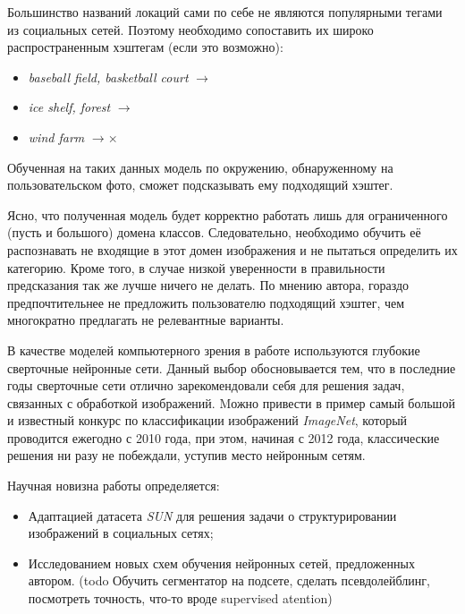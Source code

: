 \indent
  Большинство названий локаций сами по себе не являются популярными 
  тегами из социальных сетей. Поэтому необходимо
  сопоставить их широко распространенным хэштегам (если это возможно):
  
  \begin{itemize}
      \item \textit{baseball field, basketball court}  $\rightarrow$ 
      \item \textit{ice shelf, forest} $\rightarrow$ 
      \item \textit{wind farm} $\rightarrow \times$ 
  \end{itemize}
  
  \indent
  Обученная на таких данных модель по окружению,
   обнаруженному на пользовательском фото,
  сможет подсказывать ему подходящий хэштег.
  
  
  
  \indent
  Ясно, что полученная модель будет корректно работать лишь для
  ограниченного (пусть и большого) домена классов. Следовательно, необходимо 
  обучить её распознавать не входящие в этот домен изображения и
   не пытаться определить их категорию. Кроме того, в случае низкой уверенности
   в правильности предсказания так же лучше ничего не делать. 
    По мнению автора, гораздо предпочтительнее не 
   предложить пользователю подходящий хэштег, чем многократно предлагать 
   не релевантные варианты.
   
   \indent
В качестве моделей компьютерного зрения в работе 
используются глубокие сверточные
нейронные сети. Данный выбор обосновывается тем, что в последние
годы сверточные сети отлично зарекомендовали себя для решения задач, связанных
с обработкой изображений. Mожно привести в пример самый большой 
и известный
конкурс по классификации изображений \textit{ImageNet}\cite{imagenet},
который проводится ежегодно с 2010 года, при этом, начиная с 2012 года, классические
решения ни разу не побеждали, уступив место нейронным сетям.


  \indent
Научная новизна работы определяется:
\begin{itemize}

    \item Адаптацией датасета \textit{SUN} для решения задачи о структурировании
    изображений в социальных сетях;
    
    \item Исследованием новых схем обучения нейронных сетей, предложенных автором.
     (todo Обучить сегментатор на подсете, сделать псевдолейблинг, 
     посмотреть точность, 
    что-то вроде supervised atention)
    
\end{itemize}






